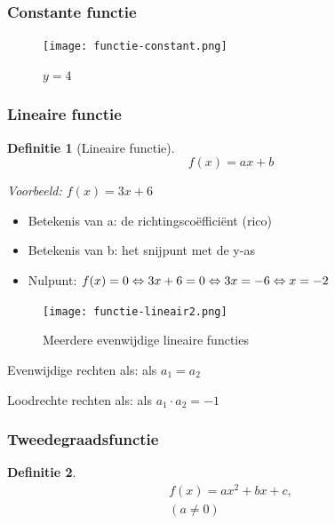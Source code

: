\documentclass{article}
\newtheorem{theorem}{Definitie}[section]
\begin{document}
\subsubsection{Constante functie}

\begin{figure}[H]
    \centering
    \texttt{[image: functie-constant.png]}
    \caption{$y=4$}
\end{figure}

\subsubsection{Lineaire functie}

\begin{theorem}[Lineaire functie]
    \begin{equation}
        f(x) = ax + b
    \end{equation}


Voorbeeld: $f(x) = 3x + 6$
\end{theorem}

\begin{itemize}
    \item Betekenis van a: de richtingscoëfficiënt (rico)
    \item Betekenis van b: het snijpunt met de y-as
    \item Nulpunt: $f(x) = 0 \\ \Leftrightarrow 3x + 6 = 0 \\ \Leftrightarrow 3x = -6  \\ \Leftrightarrow x = -2$
\end{itemize}

\begin{figure}[H]
    \centering
    \texttt{[image: functie-lineair2.png]}
    \caption{Meerdere evenwijdige lineaire functies}
\end{figure}

Evenwijdige rechten als: als $a_1 = a_2$

Loodrechte rechten als: als $a_1 \cdot a_2 = -1$

\subsubsection{Tweedegraadsfunctie}

\begin{theorem}
\begin{equation}
    \begin{aligned}
        f(x) = ax^2 + bx + c,\\
        (a \neq 0)
    \end{aligned}
\end{equation}


\end{theorem}
\end{document}

